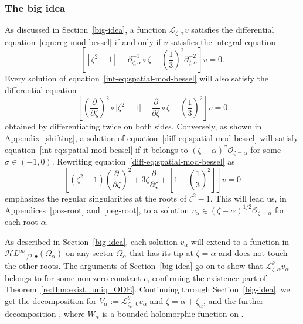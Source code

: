 \documentclass[10pt,a4paper]{amsart}
\newcommand{\singexp}[2]{\mathcal{H}L^\infty_{#1, #2}}
\newcommand{\singexpalg}[1]{\singexp{#1}{\bullet}}
\newcommand{\dualsingexp}[1]{\widehat{\mathcal{H}}L^\infty_{#1}}
\newcommand{\fracderiv}[3]{\partial^{#1}_{#2, #3}}
\newcommand{\laplace}{\mathcal{L}}
\numberwithin{equation}{section}
\begin{document}
\subsubsection{The big idea}\label{big-idea-airy}
As discussed in Section~\ref{big-idea}, a function $\laplace_{\zeta, \alpha} v$ satisfies the differential equation~\eqref{eqn:reg-mod-bessel} if and only if $v$ satisfies the integral equation
\begin{equation}\label{int-eq:spatial-mod-bessel}
\left[ \left[ \zeta^2 - 1 \right] - \fracderiv{-1}{\zeta}{\alpha} \circ \zeta - \left(\frac{1}{3}\right)^2 \fracderiv{-2}{\zeta}{\alpha} \right] v = 0.
\end{equation}
Every solution of equation~\eqref{int-eq:spatial-mod-bessel} will also satisfy the differential equation
\begin{equation}\label{diff-eq:spatial-mod-bessel}
\left[ \left(\frac{\partial}{\partial \zeta}\right)^2 \circ \bigl[ \zeta^2 - 1 \bigr] - \frac{\partial}{\partial \zeta} \circ \zeta - \left(\frac{1}{3}\right)^2 \right] v = 0
\end{equation}
obtained by differentiating twice on both sides. Conversely, as shown in Appendix~\ref{shifting}, a solution of equation~\eqref{diff-eq:spatial-mod-bessel} will satisfy equation~\eqref{int-eq:spatial-mod-bessel} if it belongs to $(\zeta - \alpha)^\sigma \mathcal{O}_{\zeta = \alpha}$ for some $\sigma \in (-1, 0)$. Rewriting equation~\eqref{diff-eq:spatial-mod-bessel} as
\[ \left[ (\zeta^2 - 1) \left(\frac{\partial}{\partial \zeta}\right)^2 + 3\zeta \frac{\partial}{\partial \zeta} + \left[ 1 - \left(\frac{1}{3}\right)^2 \right] \right] v = 0 \]
emphasizes the regular singularities at the roots of $\zeta^2 - 1$. This will lead us, in Appendices~\ref{pos-root} and~\ref{neg-root}, to a solution $v_\alpha \in (\zeta - \alpha)^{1/2} \mathcal{O}_{\zeta = \alpha}$ for each root $\alpha$.

As described in Section~\ref{big-idea}, each solution $v_\alpha$ will extend to a function in $\singexpalg{-1/2}(\Omega_\alpha)$ on any sector $\Omega_\alpha$ that has its tip at $\zeta = \alpha$ and does not touch the other roots. The arguments of Section~\ref{big-idea} go on to show that $\laplace^\theta_{\zeta, \alpha} v_\alpha$ belongs to
\smash{$ cz^{-\tau_\alpha} + \dualsingexp{-3/2}\bigl(\widehat{\Omega}_\alpha^\Lambda\bigr) $}
for some non-zero constant $c$, confirming the existence part of Theorem~\ref{re:thm:exist_uniq_ODE}. Continuing through Section~\ref{big-idea}, we get the decomposition
\smash{$ \laplace^\theta_{\zeta, \alpha} v_\alpha = {\rm e}^{-\alpha z} V_\alpha $}
for $V_\alpha := \laplace^\theta_{\zeta_\alpha, 0} v_\alpha$ and $\zeta = \alpha + \zeta_\alpha$, and the further decomposition
\smash{$\laplace_{\zeta, \alpha} v_\alpha = {\rm e}^{-\alpha z} z^{-1/2} W_\alpha$},
where $W_\alpha$ is a bounded holomorphic function on \smash{$\widehat{\Omega}_\alpha^\Lambda$}.
\end{document}
